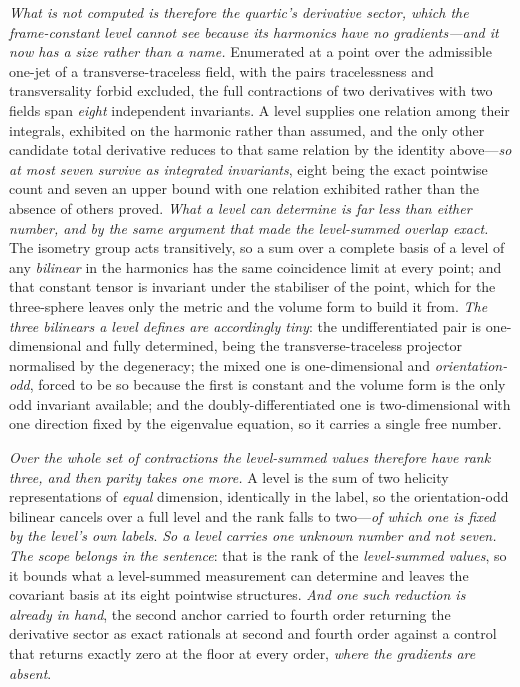 \documentclass[11pt,a4paper]{article}
\theoremstyle{plain}
\theoremstyle{definition}
\theoremstyle{remark}
\begin{document}
\emph{What is not computed is therefore the quartic's \emph{derivative} sector, which the frame-constant level
cannot see because its harmonics have no gradients---and it now has a size rather than a name.} Enumerated at
a point over the admissible one-jet of a transverse-traceless field, with the pairs tracelessness and
transversality forbid excluded, the full contractions of two derivatives with two fields span \emph{eight}
independent invariants. A level supplies one relation among their integrals, exhibited on the harmonic rather
than assumed, and the only other candidate total derivative reduces to that same relation by the identity
above---\emph{so at most seven survive as integrated invariants}, eight being the exact pointwise count and
seven an upper bound with one relation exhibited rather than the absence of others
proved.
\emph{What a level can determine is far less than either number, and by the same argument that made the
level-summed overlap exact.} The isometry group acts transitively, so a sum over a complete basis of a level
of any \emph{bilinear} in the harmonics has the same coincidence limit at every point; and that constant
tensor is invariant under the stabiliser of the point, which for the three-sphere leaves only the metric and
the volume form to build it from. \emph{The three bilinears a level defines are accordingly tiny}: the
undifferentiated pair is one-dimensional and fully determined, being the transverse-traceless projector
normalised by the degeneracy; the mixed one is one-dimensional and \emph{orientation-odd}, forced to be so
because the first is constant and the volume form is the only odd invariant available; and the
doubly-differentiated one is two-dimensional with one direction fixed by the eigenvalue equation, so it
carries a single free number.

\emph{Over the whole set of contractions the level-summed values therefore have rank three, and then parity
takes one more.} A level is the sum of two helicity representations of \emph{equal} dimension, identically in
the label, so the orientation-odd bilinear cancels over a full level and the rank falls to two---\emph{of
which one is fixed by the level's own labels}. \emph{So a level carries one unknown number and not seven.}
\emph{The scope belongs in the sentence}: that is the rank of the \emph{level-summed values}, so it bounds
what a level-summed measurement can determine and leaves the covariant basis at its eight pointwise
structures. \emph{And one such reduction is already in hand}, the second anchor carried to fourth order
returning the derivative sector as exact rationals at second and fourth order against a control that returns
exactly zero at the floor at every order, \emph{where the gradients are absent}.
\end{document}
